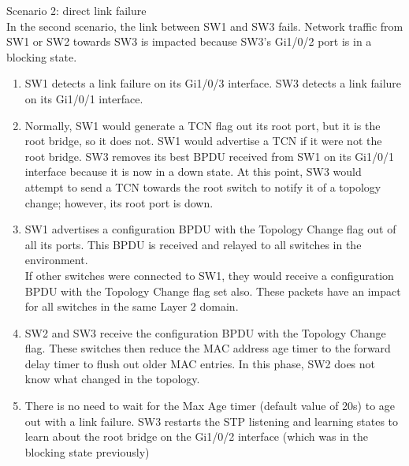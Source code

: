 \documentclass[parindent=0pt]{article}
\begin{document}
	Scenario 2: direct link failure\\
		In the second scenario, the link between SW1 and SW3 fails. Network traffic from SW1 or SW2 towards SW3 is impacted because SW3's Gi1/0/2 port is in a blocking state.	
		\begin{enumerate}
			\item SW1 detects a link failure on its Gi1/0/3 interface. SW3 detects a link failure on its Gi1/0/1 interface.
			\item Normally, SW1 would generate a TCN flag out its root port, but it is the root bridge, so it does not. SW1 would advertise a TCN if it were not the root bridge.
				SW3 removes its best BPDU received from SW1 on its Gi1/0/1 interface because it is now in a down state. At this point, SW3 would attempt to send a TCN towards the root switch to notify it of a topology change; however, its root port is down.
			\item SW1 advertises a configuration BPDU with the Topology Change flag out of all its ports. This BPDU is received and relayed to all switches in the environment.\\
				If other switches were connected to SW1, they would receive a configuration BPDU with the Topology Change flag set also. These packets have an impact for all switches in the same Layer 2 domain.
			\item SW2 and SW3 receive the configuration BPDU with the Topology Change flag. These switches then reduce the MAC address age timer to the forward delay timer to flush out older MAC entries. In this phase, SW2 does not know what changed in the topology.
			\item There is no need to wait for the Max Age timer (default value of 20s) to age out with a link failure. SW3 restarts the STP listening and learning states to learn about the root bridge on the Gi1/0/2 interface (which was in the blocking state previously)
		\end{enumerate}
\end{document}
